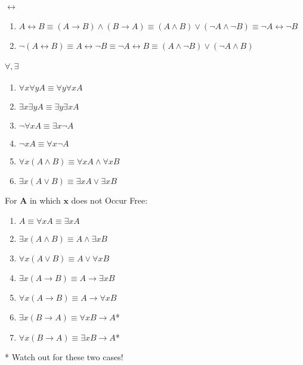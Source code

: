 \documentclass[10pt,twoside,twocolumn]{article}
\begin{document}
\paragraph{$\boldsymbol{\leftrightarrow}$}
\begin{enumerate}
\item $A\leftrightarrow B\equiv\left(A\rightarrow B\right)\land\left(B\rightarrow A\right)\equiv\left(A\land B\right)\lor\left(\lnot A\land\lnot B\right)\equiv\lnot A\leftrightarrow\lnot B$
\item $\lnot\left(A\leftrightarrow B\right)\equiv A\leftrightarrow\lnot B\equiv\lnot A\leftrightarrow B\equiv\left(A\land\lnot B\right)\lor\left(\lnot A\land B\right)$
\end{enumerate}

\paragraph{$\boldsymbol{\forall,\exists}$}
\begin{enumerate}
\item $\forall x\forall yA\equiv\forall y\forall xA$
\item $\exists x\exists yA\equiv\exists y\exists xA$
\item $\lnot\forall xA\equiv\exists x\lnot A$
\item $\lnot xA\equiv\forall x\lnot A$
\item $\forall x\left(A\land B\right)\equiv\forall xA\land\forall xB$
\item $\exists x\left(A\lor B\right)\equiv\exists xA\lor\exists xB$
\end{enumerate}
For $\boldsymbol{A}$ in which $\boldsymbol{x}$ does not Occur Free:
\begin{enumerate}
\item $A\equiv\forall xA\equiv\exists xA$
\item $\exists x\left(A\land B\right)\equiv A\land\exists xB$
\item $\forall x\left(A\lor B\right)\equiv A\lor\forall xB$
\item $\exists x\left(A\rightarrow B\right)\equiv A\rightarrow\exists xB$
\item $\forall x\left(A\rightarrow B\right)\equiv A\rightarrow\forall xB$
\item $\exists x\left(B\rightarrow A\right)\equiv\forall xB\rightarrow A${*}
\item $\forall x\left(B\rightarrow A\right)\equiv\exists xB\rightarrow A${*}
\end{enumerate}
{*} Watch out for these two cases!
\end{document}
